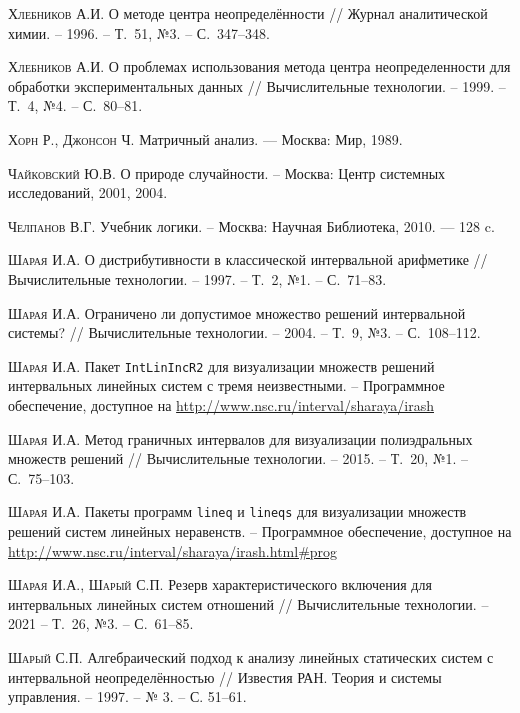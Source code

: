 \documentclass[a5paper,openany]{book}
\begin{document}
\begin{thebibliography}{999}
\textsc{Хлебников А.И.} О методе центра неопределённости // Журнал аналитической 
химии. -- 1996. -- Т.~51, №3. -- С.~347--348. 
  
\textsc{Хлебников А.И.} О проблемах использования метода центра неопределенности 
для обработки экспериментальных данных // Вычислительные технологии. -- 1999. 
-- Т.~4, №4. -- С.~80--81. 
  
\textsc{Хорн Р., Джонсон Ч.} Матричный анализ. --- Москва: Мир, 1989. 
  
\textsc{Чайковский Ю.В.} О природе случайности. -- Москва: Центр системных исследований, 
2001, 2004. 
  
\textsc{Челпанов В.Г.} Учебник логики. -- Москва: Научная Библиотека, 2010. — 128 c. 
  
\textsc{Шарая И.А.} О дистрибутивности в классической интервальной арифметике //  
Вычислительные технологии. -- 1997. -- Т.~2, №1. -- С.~71--83. 
  
\textsc{Шарая И.А.} Ограничено ли допустимое множество решений интервальной системы? //
Вычислительные технологии. -- 2004. -- Т.~9, №3. -- С.~108--112. 
  
\textsc{Шарая И.А.} Пакет \texttt{IntLinIncR2} для визуализации множеств решений 
интервальных  линейных систем с тремя неизвестными. -- Программное обеспечение, 
доступное  на \url{http://www.nsc.ru/interval/sharaya/irash} 
  
\textsc{Шарая И.А.} Метод граничных интервалов для визуализации полиэдральных множеств 
решений // Вычислительные технологии. -- 2015. -- Т.~20, №1. -- С.~75--103. 
  
\textsc{Шарая И.А.} Пакеты программ \texttt{lineq} и \texttt{lineqs} для визуализации 
множеств решений систем линейных неравенств. -- Программное обеспечение, доступное  
на \url{http://www.nsc.ru/interval/sharaya/irash.html#prog} 
  
\textsc{Шарая И.А., Шарый С.П.} Резерв характеристического включения для интервальных 
линейных систем отношений // Вычислительные технологии. -- 2021 -- Т.~26, №3. -- 
С.~61--85. 
  
\textsc{Шарый С.П.} Алгебраический подход к анализу линейных статических систем 
с интервальной неопределённостью // Известия РАН. Теория и системы управления. -- 
1997. -- № 3. -- С. 51--61. 
  

\end{thebibliography}
\end{document}
